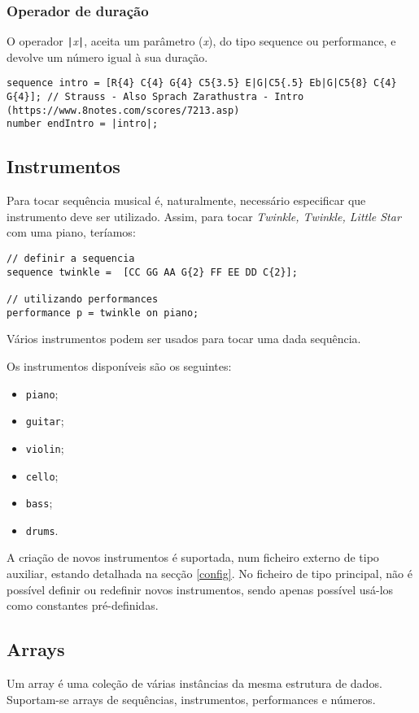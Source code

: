 \documentclass{article}
\begin{document}
\subsubsection{Operador de duração}
O operador \texttt{|}\textit{x}\texttt{|}, aceita um parâmetro (\textit{x}), do tipo sequence ou performance, e devolve um número igual à sua duração.
\begin{lstlisting} 
sequence intro = [R{4} C{4} G{4} C5{3.5} E|G|C5{.5} Eb|G|C5{8} C{4} G{4}]; // Strauss - Also Sprach Zarathustra - Intro (https://www.8notes.com/scores/7213.asp)
number endIntro = |intro|;
\end{lstlisting}

\subsection{Instrumentos}
Para tocar sequência musical é, naturalmente, necessário especificar que instrumento deve ser utilizado. Assim, para tocar \textit{Twinkle, Twinkle, Little Star} com uma piano, teríamos:
\begin{lstlisting} 
// definir a sequencia
sequence twinkle =  [CC GG AA G{2} FF EE DD C{2}];

// utilizando performances
performance p = twinkle on piano;
\end{lstlisting}

Vários instrumentos podem ser usados para tocar uma dada sequência.

Os instrumentos disponíveis são os seguintes:
\begin{itemize}
    \item \texttt{piano};
    \item \texttt{guitar};
    \item \texttt{violin};
    \item \texttt{cello};
    \item \texttt{bass};
    \item \texttt{drums}.
\end{itemize}
A criação de novos instrumentos é suportada, num ficheiro externo de tipo auxiliar, estando detalhada na secção \ref{config}. No ficheiro de tipo principal, não é possível definir ou redefinir novos instrumentos, sendo apenas possível usá-los como constantes pré-definidas.

\subsection{Arrays}
Um array é uma coleção de várias instâncias da mesma estrutura de dados. Suportam-se arrays de sequências, instrumentos, performances e números.
\end{document}
